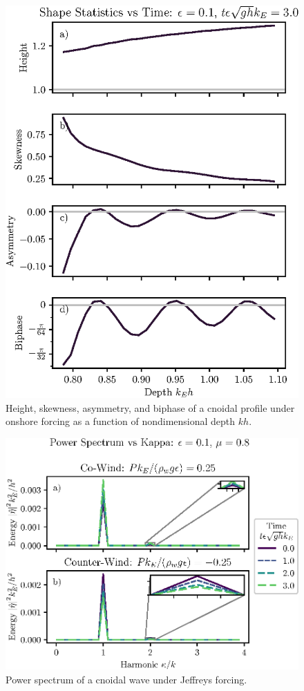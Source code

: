 \documentclass{jfm}
\begin{document}
\begin{figure}
  \centering
  \includegraphics{Skew-Asymm-Cnoidal-kh.eps}
  \caption{
    Height, skewness, asymmetry, and biphase of a cnoidal profile under
    onshore forcing as a function of nondimensional depth $kh$.
  }
\end{figure}

\begin{figure}
  \centering
  \includegraphics{Power-Spectrum-Jeffreys.eps}
  \caption{
    Power spectrum of a cnoidal wave under Jeffreys forcing.
  }
\end{figure}
\end{document}
